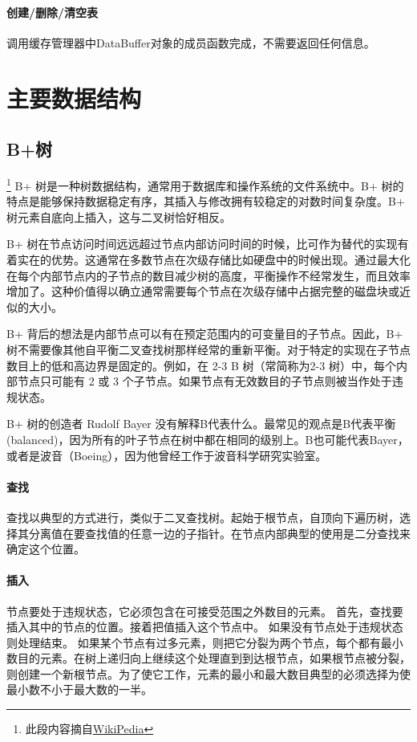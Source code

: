 \documentclass[UTF8]{ctexrep} %
\begin{document}
\paragraph{创建/删除/清空表}
调用缓存管理器中DataBuffer对象的成员函数完成，不需要返回任何信息。

\section{主要数据结构}
\subsection{B+树}
\footnote{此段内容摘自\href{https://en.wikipedia.org/wiki/B+_tree}{WikiPedia}}
B+ 树是一种树数据结构，通常用于数据库和操作系统的文件系统中。B+ 树的特点是能够保持数据稳定有序，其插入与修改拥有较稳定的对数时间复杂度。B+ 树元素自底向上插入，这与二叉树恰好相反。
\par
B+ 树在节点访问时间远远超过节点内部访问时间的时候，比可作为替代的实现有着实在的优势。这通常在多数节点在次级存储比如硬盘中的时候出现。通过最大化在每个内部节点内的子节点的数目减少树的高度，平衡操作不经常发生，而且效率增加了。这种价值得以确立通常需要每个节点在次级存储中占据完整的磁盘块或近似的大小。
\par
B+ 背后的想法是内部节点可以有在预定范围内的可变量目的子节点。因此，B+ 树不需要像其他自平衡二叉查找树那样经常的重新平衡。对于特定的实现在子节点数目上的低和高边界是固定的。例如，在 2-3 B 树（常简称为2-3 树）中，每个内部节点只可能有 2 或 3 个子节点。如果节点有无效数目的子节点则被当作处于违规状态。
\par
B+ 树的创造者 Rudolf Bayer 没有解释B代表什么。最常见的观点是B代表平衡(balanced)，因为所有的叶子节点在树中都在相同的级别上。B也可能代表Bayer，或者是波音（Boeing），因为他曾经工作于波音科学研究实验室。

\paragraph{查找}
查找以典型的方式进行，类似于二叉查找树。起始于根节点，自顶向下遍历树，选择其分离值在要查找值的任意一边的子指针。在节点内部典型的使用是二分查找来确定这个位置。

\paragraph{插入}
节点要处于违规状态，它必须包含在可接受范围之外数目的元素。
首先，查找要插入其中的节点的位置。接着把值插入这个节点中。
如果没有节点处于违规状态则处理结束。
如果某个节点有过多元素，则把它分裂为两个节点，每个都有最小数目的元素。在树上递归向上继续这个处理直到到达根节点，如果根节点被分裂，则创建一个新根节点。为了使它工作，元素的最小和最大数目典型的必须选择为使最小数不小于最大数的一半。
\end{document}
